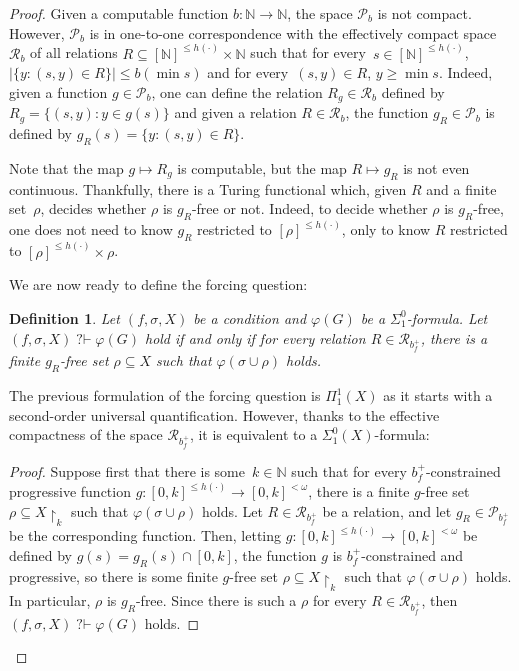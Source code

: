 \documentclass[10pt,a4paper]{article}
\def\P{\mathcal{P}}
\newcommand{\uh}{\upharpoonright}
\newcommand{\qvdash}{\operatorname{{?}{\vdash}}}
\newcommand{\NN}[0]{\mathbb{N}}
\numberwithin{theorem}{section}
\newtheorem{lemma}[theorem]{Lemma}
\newtheorem{definition}[theorem]{Definition}
\newcommand{\R}{\mathcal{R}}
\begin{document}
\begin{proof}
Given a computable function $b : \NN \to \NN$, the space $\P_b$ is not compact.
However, $\P_b$ is in one-to-one correspondence with the effectively compact space $\R_b$ of all relations $R \subseteq [\NN]^{\leq h(\cdot)} \times \NN$ such that for every~$s \in [\NN]^{\leq h(\cdot)}$, $|\{ y : (s, y) \in R \}| \leq b(\min s)$ and for every~$(s, y) \in R$, $y \geq \min s$. Indeed, given a function $g \in \P_b$, one can define the relation $R_g \in \R_b$ defined by $R_g = \{ (s, y) : y \in g(s) \}$ and given a relation $R \in \R_b$, the function $g_R \in \P_b$ is defined by $g_R(s) = \{ y : (s, y) \in R \}$.

Note that the map $g \mapsto R_g$ is computable, but the map $R \mapsto g_R$ is not even continuous. Thankfully, there is a Turing functional which, given $R$ and a finite set~$\rho$, decides whether $\rho$ is $g_R$-free or not. Indeed, to decide whether $\rho$ is $g_R$-free, one does not need to know $g_R$ restricted to $[\rho]^{\leq h(\cdot)}$, only to know $R$ restricted to $[\rho]^{\leq h(\cdot)} \times \rho$.

We are now ready to define the forcing question:

\begin{definition}
Let $(f, \sigma, X)$ be a condition and $\varphi(G)$ be a $\Sigma^0_1$-formula.
Let $(f, \sigma, X) \qvdash \varphi(G)$ hold if and only if for every relation $R \in \R_{b_f^{+}}$, there is a finite $g_R$-free set $\rho \subseteq X$ such that $\varphi(\sigma \cup \rho)$ holds.
\end{definition}

The previous formulation of the forcing question is $\Pi^1_1(X)$ as it starts with a second-order universal quantification. However, thanks to the effective compactness of the space $\R_{b_f^{+}}$, it is equivalent to a $\Sigma^0_1(X)$-formula:

\begin{proof}
Suppose first that there is some~$k \in \NN$ such that for every $b_f^{+}$-constrained progressive function $g : [0, k]^{\leq h(\cdot)} \to [0, k]^{<\omega}$, there is a finite $g$-free set $\rho \subseteq X \uh_k$ such that $\varphi(\sigma \cup \rho)$ holds. Let $R \in \R_{b_f^+}$ be a relation,
and let $g_R \in \P_{b_f^+}$ be the corresponding function. Then, letting $g : [0, k]^{\leq h(\cdot)} \to [0, k]^{<\omega}$ be defined by $g(s) = g_R(s) \cap [0, k]$, the function $g$ is $b_f^{+}$-constrained and progressive, so there is some finite $g$-free set $\rho \subseteq X \uh_k$ such that $\varphi(\sigma \cup \rho)$ holds. In particular, $\rho$ is $g_R$-free. Since there is such a $\rho$ for every $R \in \R_{b_f^+}$, then $(f, \sigma, X) \qvdash \varphi(G)$ holds.


\end{proof}
\end{proof}
\end{document}
